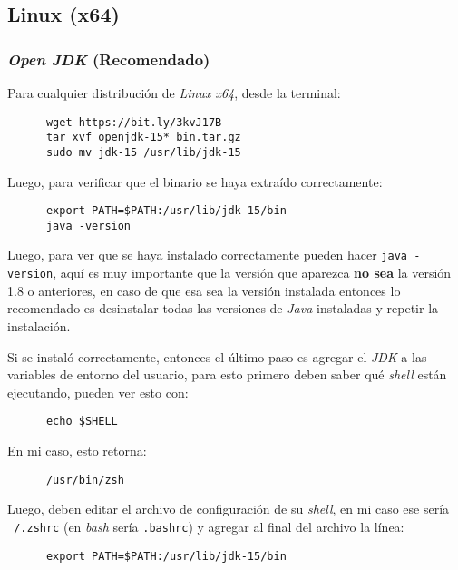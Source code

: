 \subsection{Linux (x64)}
  \subsubsection{\textit{Open JDK} (Recomendado)}
    Para cualquier distribución de \textit{Linux x64}, desde la terminal:

    \begin{verbatim}
      wget https://bit.ly/3kvJ17B
      tar xvf openjdk-15*_bin.tar.gz
      sudo mv jdk-15 /usr/lib/jdk-15
    \end{verbatim}

    Luego, para verificar que el binario se haya extraído correctamente:

    \begin{verbatim}
      export PATH=$PATH:/usr/lib/jdk-15/bin
      java -version
    \end{verbatim}

    Luego, para ver que se haya instalado correctamente pueden hacer \texttt{java -version}, aquí es
    muy importante que la versión que aparezca \textbf{no sea} la versión 1.8 o anteriores, en caso 
    de que esa sea la versión instalada entonces lo recomendado es desinstalar todas las versiones
    de \textit{Java} instaladas y repetir la instalación.

    Si se instaló correctamente, entonces el último paso es agregar el \textit{JDK} a 
    las variables de entorno del usuario, para esto primero deben saber qué 
    \textit{shell} están ejecutando, pueden ver esto con:

    \begin{verbatim}
      echo $SHELL
    \end{verbatim}

    En mi caso, esto retorna:

    \begin{verbatim}
      /usr/bin/zsh
    \end{verbatim}

    Luego, deben editar el archivo de configuración de su \textit{shell}, en mi caso ese
    sería \texttt{~/.zshrc} (en \textit{bash} sería \texttt{.bashrc}) y 
    agregar al final del archivo la línea:
    
    \begin{verbatim}
      export PATH=$PATH:/usr/lib/jdk-15/bin
    \end{verbatim}

